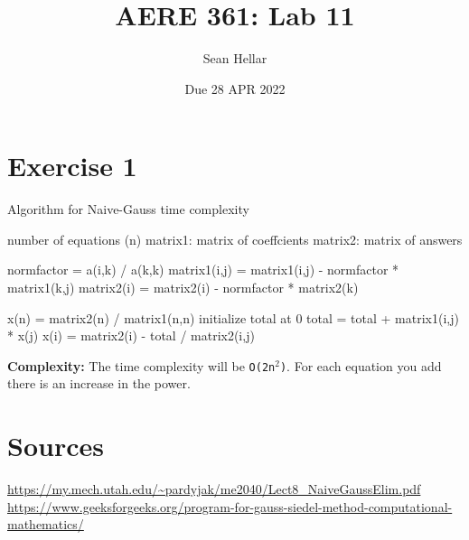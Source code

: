 \documentclass{article}
\title{AERE 361: Lab 11}
\date{Due 28 APR 2022}
\author{Sean Hellar}
\begin{document}
\maketitle
\newpage

\section{Exercise 1}

\begin{algorithm}
	\caption{Algorithm for Naive-Gauss time complexity}

	\begin{algorithmic}
		\Statex {}
		\State number of equations (n)
		\State matrix1: matrix of coeffcients 
		\State matrix2: matrix of answers

		\State {}
				\State normfactor = a(i,k) / a(k,k)
					\State matrix1(i,j) = matrix1(i,j) - normfactor * matrix1(k,j)
				\EndFor
				\State matrix2(i) = matrix2(i) - normfactor * matrix2(k)
			\EndFor
		\EndFor

		\State {}
		\State x(n) = matrix2(n) / matrix1(n,n)
			\State initialize total at 0
				\State total =  total + matrix1(i,j) * x(j)
			\EndFor
			\State x(i) = matrix2(i) - total / matrix2(i,j)
		\EndFor

	\end{algorithmic}

\end{algorithm}

\textbf{Complexity:} The time complexity will be \texttt{O(2n$^{2}$)}. For each equation you add there is an increase in the power. 


\newpage

\section{Sources} 

\url{https://my.mech.utah.edu/~pardyjak/me2040/Lect8_NaiveGaussElim.pdf}
\url{https://www.geeksforgeeks.org/program-for-gauss-siedel-method-computational-mathematics/}
\end{document}
